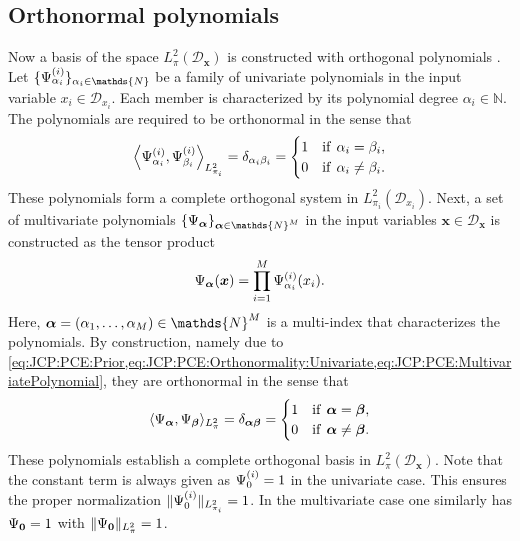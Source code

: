 \subsection{Orthonormal polynomials}
Now a basis of the space \(L_{\pi}^2(\mathcal{D}_{\bm{x}})\) is constructed with orthogonal polynomials \cite{Math:Stahl1992,Math:Gautschi2004,Math:Jackson2004}.
Let \(\{\basis^{(i)}_{\alpha_i}\}_{\alpha_i \in \mathds{N}}\) be a family of univariate polynomials in the input variable \(x_i \in \mathcal{D}_{x_i}\).
Each member is characterized by its polynomial degree \(\alpha_i \in \mathds{N}\).
The polynomials are required to be orthonormal in the sense that
\begin{equation} \label{eq:JCP:PCE:Orthonormality:Univariate}
  \left\langle \Psi^{(i)}_{\alpha_i}, \Psi^{(i)}_{\beta_i} \right\rangle_{L_{\pi_i}^2} = \delta_{\alpha_i \beta_i}
  = \begin{cases} 1 &\text{if} \;\, \alpha_i = \beta_i, \\
                  0 &\text{if} \;\, \alpha_i \neq \beta_i.
    \end{cases}
\end{equation}
These polynomials form a complete orthogonal system in \(L_{\pi_i}^2(\mathcal{D}_{x_i})\).
Next, a set of multivariate polynomials \(\{\basis_{\bm{\alpha}}\}_{\bm{\alpha} \in \mathds{N}^\dimParam}\)
in the input variables \(\bm{x} \in \mathcal{D}_{\bm{x}}\) is constructed as the tensor product
\begin{equation} \label{eq:JCP:PCE:MultivariatePolynomial}
  \Psi_{\bm{\alpha}}(\bm{x}) = \prod\limits_{i=1}^M \Psi^{(i)}_{\alpha_i}(x_i).
\end{equation}
Here, \(\bm{\alpha} = (\alpha_1,\ldots,\alpha_\dimParam) \in \mathds{N}^\dimParam\) is a multi-index that characterizes the polynomials.
By construction, namely due to \cref{eq:JCP:PCE:Prior,eq:JCP:PCE:Orthonormality:Univariate,eq:JCP:PCE:MultivariatePolynomial}, they are orthonormal in the sense that
\begin{equation} \label{eq:JCP:PCE:Orthonormality:Multivariate}
  \langle \Psi_{\bm{\alpha}}, \Psi_{\bm{\beta}} \rangle_{L_{\pi}^2} = \delta_{\bm{\alpha} \bm{\beta}}
  = \begin{cases} 1 &\text{if} \;\, \bm{\alpha} = \bm{\beta}, \\
                  0 &\text{if} \;\, \bm{\alpha} \neq \bm{\beta}.
    \end{cases}
\end{equation}
These polynomials establish a complete orthogonal basis in \(L_{\pi}^2(\mathcal{D}_{\bm{x}})\).
Note that the constant term is always given as \(\Psi^{(i)}_{0} = 1\) in the univariate case.
This ensures the proper normalization \(\lVert \Psi^{(i)}_{0} \rVert_{L_{\pi_i}^2} = 1\).
In the multivariate case one similarly has \(\Psi_{\bm{0}} = 1\) with \(\lVert \Psi_{\bm{0}} \rVert_{L_{\pi}^2} = 1\).

